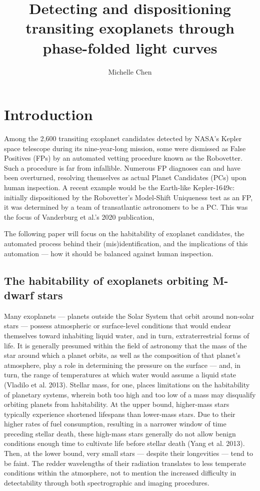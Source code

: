 \documentclass[onecolumn, 12pt]{article}
\title{Detecting and dispositioning transiting exoplanets through phase-folded light curves}
\author{Michelle Chen}
\begin{document}
\maketitle

\section{Introduction}

Among the 2,600 transiting exoplanet candidates detected by NASA's Kepler space telescope during its nine-year-long mission, some were dismissed as False Positives (FPs) by an automated vetting procedure known as the Robovetter. Such a procedure is far from infallible. Numerous FP diagnoses can and have been overturned, resolving themselves as actual Planet Candidates (PCs) upon human inspection. A recent example would be the Earth-like Kepler-1649c: initially dispositioned by the Robovetter's Model-Shift Uniqueness test as an FP, it was determined by a team of transatlantic astronomers to be a PC. This was the focus of Vanderburg et al.'s 2020 publication, 

The following paper will focus on the habitability of exoplanet candidates, the automated process behind their (mis)identification, and the implications of this automation — how it should be balanced against human inspection.

\subsection{The habitability of exoplanets orbiting M-dwarf stars}

Many exoplanets — planets outside the Solar System that orbit around non-solar stars — possess atmospheric or surface-level conditions that would endear themselves toward inhabiting liquid water, and in turn, extraterrestrial forms of life. It is generally presumed within the field of astronomy that the mass of the star around which a planet orbits, as well as the composition of that planet's atmosphere, play a role in determining the pressure on the surface — and, in turn, the range of temperatures at which water would assume a liquid state (Vladilo et al. 2013). Stellar mass, for one, places limitations on the habitability of planetary systems, wherein both too high and too low of a mass may disqualify orbiting planets from habitability. At the upper bound, higher-mass stars typically experience shortened lifespans than lower-mass stars. Due to their higher rates of fuel consumption, resulting in a narrower window of time preceding stellar death, these high-mass stars generally do not allow benign conditions enough time to cultivate life before stellar death (Yang et al. 2013). Then, at the lower bound, very small stars — despite their longevities — tend to be faint. The redder wavelengths of their radiation translates to less temperate conditions within the atmosphere, not to mention the increased difficulty in detectability through both spectrographic and imaging procedures.
\end{document}
